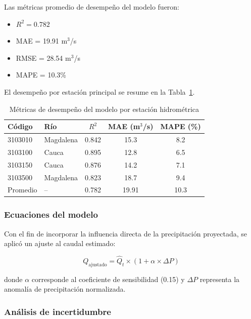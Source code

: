 Las métricas promedio de desempeño del modelo fueron:

\begin{itemize}
    \item $R^2 = 0.782$
    \item MAE = 19.91 m$^3$/s
    \item RMSE = 28.54 m$^3$/s
    \item MAPE = 10.3\%
\end{itemize}

El desempeño por estación principal se resume en la Tabla~\ref{tab:metricas_estaciones}.

\begin{table}[H]
\centering
\caption{Métricas de desempeño del modelo por estación hidrométrica}
\label{tab:metricas_estaciones}
\begin{tabular}{l l c c c}
\hline
\textbf{Código} & \textbf{Río} & $R^2$ & \textbf{MAE (m$^3$/s)} & \textbf{MAPE (\%)} \\
\hline
3103010 & Magdalena & 0.842 & 15.3 & 8.2 \\
3103100 & Cauca & 0.895 & 12.8 & 6.5 \\
3103150 & Cauca & 0.876 & 14.2 & 7.1 \\
3103500 & Magdalena & 0.823 & 18.7 & 9.4 \\
\hline
Promedio & -- & 0.782 & 19.91 & 10.3 \\
\hline
\end{tabular}
\end{table}

\subsubsection{Ecuaciones del modelo}

Con el fin de incorporar la influencia directa de la precipitación proyectada, se aplicó un ajuste al caudal estimado:

\begin{equation}
Q_{\text{ajustado}} = \hat{Q}_t \times \left(1 + \alpha \times \Delta P \right)
\end{equation}

donde $\alpha$ corresponde al coeficiente de sensibilidad (0.15) y $\Delta P$ representa la anomalía de precipitación normalizada.

\subsubsection{Análisis de incertidumbre}

